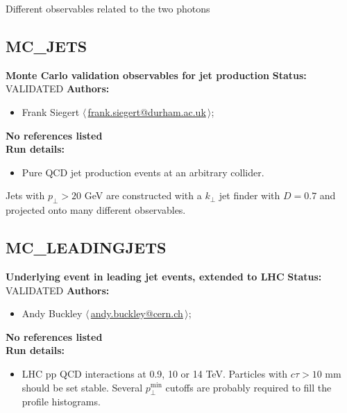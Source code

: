 \noindent Different observables related to the two photons

\clearpage


\clearpage

\subsection{MC\_JETS}
\textbf{Monte Carlo validation observables for jet production}\newline
\textbf{Status:} VALIDATED\newline
\textbf{Authors:}
\begin{itemize}
  \item Frank Siegert $\langle\,$\href{mailto:frank.siegert@durham.ac.uk}{frank.siegert@durham.ac.uk}$\,\rangle$;
\end{itemize}
\textbf{No references listed}\\ 
\textbf{Run details:}
\begin{itemize}

  \item Pure QCD jet production events at an arbitrary collider.\end{itemize}

\noindent Jets with $p_\perp>20$ GeV are constructed with a $k_\perp$ jet finder with $D=0.7$ and projected onto many different observables.

\clearpage


\clearpage

\subsection{MC\_LEADINGJETS}
\textbf{Underlying event in leading jet events, extended to LHC}\newline
\textbf{Status:} VALIDATED\newline
\textbf{Authors:}
\begin{itemize}
  \item Andy Buckley $\langle\,$\href{mailto:andy.buckley@cern.ch}{andy.buckley@cern.ch}$\,\rangle$;
\end{itemize}
\textbf{No references listed}\\ 
\textbf{Run details:}
\begin{itemize}

  \item LHC pp QCD interactions at 0.9, 10 or 14 TeV. Particles with  $c \tau > 10$ mm should be set stable. Several $p_\perp^\text{min}$  cutoffs are probably required to fill the profile histograms.\end{itemize}

